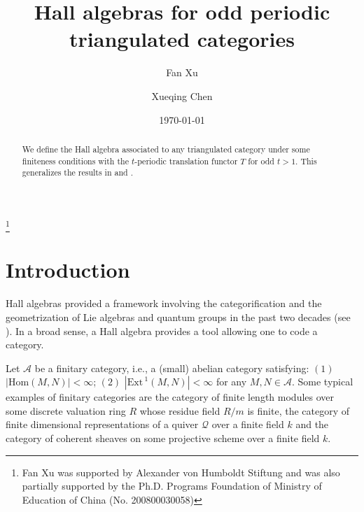 \documentclass{amsart}
\theoremstyle{definition}
\numberwithin{equation}{section}
\begin{document}
\title{Hall algebras for odd periodic triangulated categories}

\author{Fan Xu}
\author{Xueqing Chen}

\address{Department of Mathematics\\ Tsinghua University,
Beijing{\rm 100875},P.R.China} 

\address{Department of Mathematical and Computer Sciences\\University of Wisconsin--Whitewater\\
800 W. Main Street\\ Whitewater, WI. 53190. USA}

\thanks{Fan Xu was supported by
Alexander von Humboldt Stiftung and was also partially supported by
the Ph.D. Programs Foundation of Ministry of Education of China (No.
200800030058)}


\date{\today}


\begin{abstract}
We define the Hall algebra associated to any triangulated category
under some finiteness conditions with the $t$-periodic translation
functor $T$ for odd $t>1.$ This generalizes the results in
\cite{Toen2005} and \cite{XX2006}.
\end{abstract}

\maketitle

\section{Introduction}
Hall algebras provided a framework involving the categorification
and the geometrization of Lie algebras and quantum groups in the
past two decades (see \cite{Lusztig2000, Nakajima1998, PX2000,
Ringel1990, Xiao97}). In a broad sense, a Hall algebra provides a
tool allowing one to code a category.

Let {$\mathcal{A}$} be a finitary category, i.e., a (small) abelian
category satisfying: $(1)$ $|{\mathrm{Hom}} (M,N)| <\infty $; $(2)$ $|{\mbox{Ext}\,}^1
(M,N)| <\infty$ for any $M,N \in \mathcal{A}$. Some typical examples
of finitary categories are the category of finite length modules
over some discrete valuation ring $R$ whose residue field $R/m$ is
finite, the category of finite dimensional representations of a
quiver $\mathcal{Q}$ over a finite field $k$ and the category of
coherent sheaves on some projective scheme over a finite field $k$.
\end{document}
